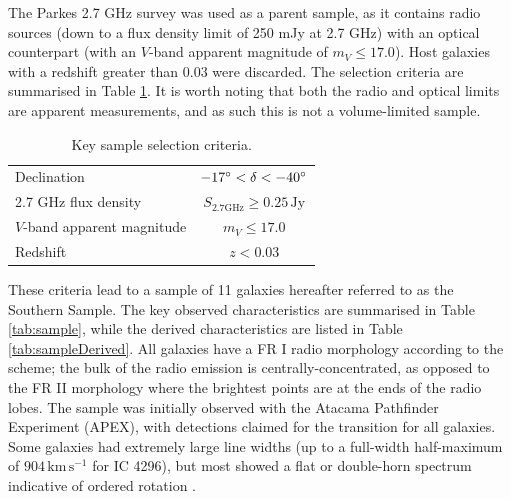 	The Parkes 2.7 GHz survey \citep{Ekers1989} was used as a parent sample, as it contains radio sources (down to a flux density limit of 250 mJy at 2.7 GHz) with an optical counterpart (with an $V$-band apparent magnitude of $m_V \le 17.0$). Host galaxies with a redshift greater than 0.03 were discarded. The selection criteria are summarised in Table \ref{tab:selection}. It is worth noting that both the radio and optical limits are apparent measurements, and as such this is not a volume-limited sample.
	\begin{table}
		\centering
		\caption{Key sample selection criteria.}
		\label{tab:selection}
		\begin{tabular}{l c}
			\hline
			\hline
			Declination				& $-17\degree < \delta < -40\degree$ \\
			2.7 GHz flux density 		& $S_\text{2.7GHz} \ge 0.25 \, \text{Jy} $ \\
			$V$-band apparent magnitude 	& $m_V \le 17.0 $ \\
			Redshift 					& $z < 0.03$ \\			
			\hline
			\hline
		\end{tabular}
	\end{table}
	These criteria lead to a sample of 11 galaxies hereafter referred to as the Southern Sample. The key observed characteristics are summarised in Table \ref{tab:sample}, while the derived characteristics are listed in Table \ref{tab:sampleDerived}. All galaxies have a FR I radio morphology according to the \citet{Fanaroff1974} scheme; the bulk of the radio emission is centrally-concentrated, as opposed to the FR II morphology where the brightest points are at the ends of the radio lobes. 
	The sample was initially observed with the Atacama Pathfinder Experiment (APEX), with detections claimed for the  transition for all galaxies. Some galaxies had extremely large line widths (up to a full-width half-maximum of $904 \, \mathrm{km \, s^{-1}}$ for IC 4296), but most showed a flat or double-horn spectrum indicative of ordered rotation \citep{Prandoni2012}.
